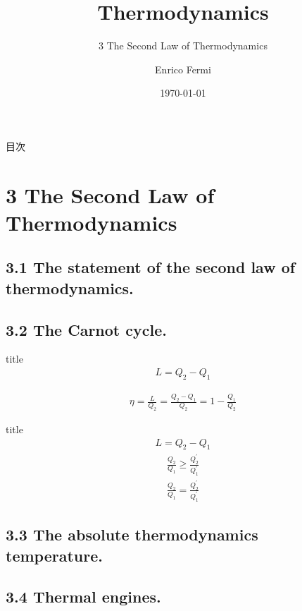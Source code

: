 \documentclass[dvipdfmx, 10pt, aspectratio = 169]{beamer}
\title{Thermodynamics}
\subtitle{3 The Second Law of Thermodynamics}
\date{\today}
\author{Enrico Fermi}
\begin{document}
\begin{frame}
	\titlepage
\end{frame}

\begin{frame}{目次}
\tableofcontents
\end{frame}

\section{3 The Second Law of Thermodynamics}
\subsection{3.1 The statement of the second law of thermodynamics.}
\subsection{3.2 The Carnot cycle.}

\begin{frame}{title}
	\begin{align}
		L = Q_2 - Q_1
	\end{align}
	
	\begin{align}
		\eta = \frac{L}{Q_2} = \frac{Q_2 - Q_1}{Q_2} = 1 - \frac{Q_1}{Q_2}
	\end{align}
\end{frame}

\begin{frame}{title}
	\begin{align*}
		L = Q_2 - Q_1
	\end{align*}
	\begin{align}
		\frac{Q_2}{Q_1} \ge \frac{Q_2^\prime}{Q_1^\prime}
	\end{align}
	\begin{align}
		\frac{Q_2}{Q_1} = \frac{Q_2^\prime}{Q_1^\prime}
	\end{align}
\end{frame}

\subsection{3.3 The absolute thermodynamics temperature.}
\subsection{3.4 Thermal engines.}
\end{document}

